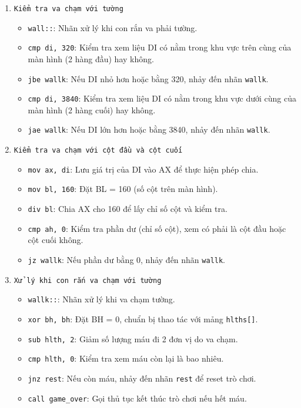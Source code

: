 \documentclass[12pt]{article}
\begin{document}
\begin{enumerate}[label=\textbf{\arabic*.}]
    \item \texttt{Kiểm tra va chạm với tường}
    \begin{itemize}
        \item \texttt{wall::}: Nhãn xử lý khi con rắn va phải tường.
        \item \texttt{cmp di, 320}: Kiểm tra xem liệu DI có nằm trong khu vực trên cùng của màn hình (2 hàng đầu) hay không.
        \item \texttt{jbe wallk}: Nếu DI nhỏ hơn hoặc bằng 320, nhảy đến nhãn \texttt{wallk}.
        \item \texttt{cmp di, 3840}: Kiểm tra xem liệu DI có nằm trong khu vực dưới cùng của màn hình (2 hàng cuối) hay không.
        \item \texttt{jae wallk}: Nếu DI lớn hơn hoặc bằng 3840, nhảy đến nhãn \texttt{wallk}.
    \end{itemize}

    \item \texttt{Kiểm tra va chạm với cột đầu và cột cuối}
    \begin{itemize}
        \item \texttt{mov ax, di}: Lưu giá trị của DI vào AX để thực hiện phép chia.
        \item \texttt{mov bl, 160}: Đặt BL = 160 (số cột trên màn hình).
        \item \texttt{div bl}: Chia AX cho 160 để lấy chỉ số cột và kiểm tra.
        \item \texttt{cmp ah, 0}: Kiểm tra phần dư (chỉ số cột), xem có phải là cột đầu hoặc cột cuối không.
        \item \texttt{jz wallk}: Nếu phần dư bằng 0, nhảy đến nhãn \texttt{wallk}.
    \end{itemize}

    \item \texttt{Xử lý khi con rắn va chạm với tường}
    \begin{itemize}
        \item \texttt{wallk::}: Nhãn xử lý khi va chạm tường.
        \item \texttt{xor bh, bh}: Đặt BH = 0, chuẩn bị thao tác với mảng \texttt{hlths[]}.
        \item \texttt{sub hlth, 2}: Giảm số lượng máu đi 2 đơn vị do va chạm.
        \item \texttt{cmp hlth, 0}: Kiểm tra xem máu còn lại là bao nhiêu.
        \item \texttt{jnz rest}: Nếu còn máu, nhảy đến nhãn \texttt{rest} để reset trò chơi.
        \item \texttt{call game\_over}: Gọi thủ tục kết thúc trò chơi nếu hết máu.
    \end{itemize}


\end{enumerate}
\end{document}
